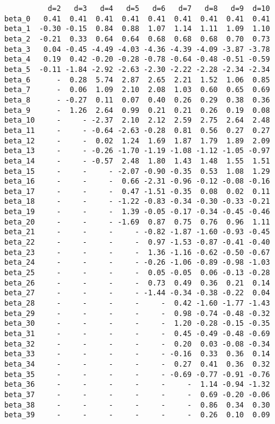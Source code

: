 \documentclass[11pt]{article}
\begin{document}
    
    \begin{verbatim}
          d=2   d=3   d=4   d=5   d=6   d=7   d=8   d=9  d=10
beta_0   0.41  0.41  0.41  0.41  0.41  0.41  0.41  0.41  0.41
beta_1  -0.30 -0.15  0.84  0.88  1.07  1.14  1.11  1.09  1.10
beta_2  -0.21  0.33  0.64  0.64  0.68  0.68  0.68  0.70  0.73
beta_3   0.04 -0.45 -4.49 -4.03 -4.36 -4.39 -4.09 -3.87 -3.78
beta_4   0.19  0.42 -0.20 -0.28 -0.78 -0.64 -0.48 -0.51 -0.59
beta_5  -0.11 -1.84 -2.92 -2.63 -2.30 -2.22 -2.28 -2.34 -2.34
beta_6      -  0.28  5.74  2.87  2.65  2.21  1.52  1.06  0.85
beta_7      -  0.06  1.09  2.10  2.08  1.03  0.60  0.65  0.69
beta_8      - -0.27  0.11  0.07  0.40  0.26  0.29  0.38  0.36
beta_9      -  1.26  2.64  0.99  0.21  0.21  0.26  0.19  0.08
beta_10     -     - -2.37  2.10  2.12  2.59  2.75  2.64  2.48
beta_11     -     - -0.64 -2.63 -0.28  0.81  0.56  0.27  0.27
beta_12     -     -  0.02  1.24  1.69  1.87  1.79  1.89  2.09
beta_13     -     - -0.26 -1.70 -1.19 -1.08 -1.12 -1.05 -0.97
beta_14     -     - -0.57  2.48  1.80  1.43  1.48  1.55  1.51
beta_15     -     -     - -2.07 -0.90 -0.35  0.53  1.08  1.29
beta_16     -     -     -  0.66 -2.31 -0.96 -0.12 -0.08 -0.16
beta_17     -     -     -  0.47 -1.51 -0.35  0.08  0.02  0.11
beta_18     -     -     - -1.22 -0.83 -0.34 -0.30 -0.33 -0.21
beta_19     -     -     -  1.39 -0.05 -0.17 -0.34 -0.45 -0.46
beta_20     -     -     - -1.69  0.87  0.75  0.76  0.96  1.11
beta_21     -     -     -     - -0.82 -1.87 -1.60 -0.93 -0.45
beta_22     -     -     -     -  0.97 -1.53 -0.87 -0.41 -0.40
beta_23     -     -     -     -  1.36 -1.16 -0.62 -0.50 -0.67
beta_24     -     -     -     - -0.26 -1.06 -0.89 -0.98 -1.03
beta_25     -     -     -     -  0.05 -0.05  0.06 -0.13 -0.28
beta_26     -     -     -     -  0.73  0.49  0.36  0.21  0.14
beta_27     -     -     -     - -1.44 -0.34 -0.38 -0.22  0.04
beta_28     -     -     -     -     -  0.42 -1.60 -1.77 -1.43
beta_29     -     -     -     -     -  0.98 -0.74 -0.48 -0.32
beta_30     -     -     -     -     -  1.20 -0.28 -0.15 -0.35
beta_31     -     -     -     -     -  0.45 -0.49 -0.48 -0.69
beta_32     -     -     -     -     -  0.20  0.03 -0.08 -0.34
beta_33     -     -     -     -     - -0.16  0.33  0.36  0.14
beta_34     -     -     -     -     -  0.27  0.41  0.36  0.32
beta_35     -     -     -     -     - -0.69 -0.77 -0.91 -0.76
beta_36     -     -     -     -     -     -  1.14 -0.94 -1.32
beta_37     -     -     -     -     -     -  0.69 -0.20 -0.06
beta_38     -     -     -     -     -     -  0.86  0.34  0.30
beta_39     -     -     -     -     -     -  0.26  0.10  0.09

\end{verbatim}
\end{document}
